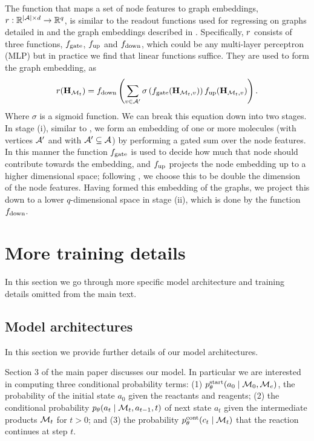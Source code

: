 The function that maps a set of node features to  graph embeddings, $r: \mathbb{R}^{|{\mathcal{A}}|\times d} \to \mathbb{R}^{q}$, is similar to the readout functions used for regressing on graphs detailed in \citep[Eq. 3]{gilmer2017neural} and the graph embeddings described in \citet[\S B.1]{li2018learning}. 
Specifically, $r$ consists of three functions, $f_\textrm{gate}$, $f_\textrm{up}$ and $f_\textrm{down}$, which could be any multi-layer perceptron (MLP) but in practice we find that linear functions suffice.
They are used to form the graph embedding, as
\begin{align}
	r({\mathbf{H}}_{{\mathcal{M}}_t}) = f_\textrm{down}\left(\sum_{v \in {\mathcal{A}}'} \sigma\left(f_\textrm{gate}({\mathbf{H}}_{{\mathcal{M}}_t,v})\right) f_\textrm{up}({\mathbf{H}}_{{\mathcal{M}}_t, v})\right).
	\label{eq:graph-embedding}
\end{align}
Where $\sigma$ is a sigmoid function.
We can break this equation down into two stages.
In stage (i), similar to \citet[\S B.1]{li2018learning}, we form an embedding of one or more molecules (with vertices ${\mathcal{A}}'$ and with ${\mathcal{A}}' \subseteq  {\mathcal{A}}$) by performing a gated sum over the node features. 
In this manner the function $f_\textrm{gate}$ is used to decide how much that node should contribute towards the embedding,
 and $f_\textrm{up}$ projects the node embedding up to a higher dimensional space; following \citet[\S B.1]{li2018learning}, we choose this to be double the dimension of the node features.
Having formed this embedding of the graphs, we project this down to a lower $q$-dimensional space in stage (ii), which is done by the function $f_\textrm{down}$. 







\section{More training details}

In this section we go through more specific model architecture and training details omitted from the main text. 

\subsection{Model architectures}
In this section we provide further details of our model architectures.

Section 3 of the main paper discusses our model.
In particular we are interested in computing three conditional probability terms: (1) $p_\theta^{\mathrm{start}}(a_0 \mid {\mathcal{M}}_0, {\mathcal{M}}_e)$, the probability of the initial state $a_0$ given the reactants and reagents; 
(2) the conditional probability $p_\theta(a_t \mid {\mathcal{M}}_t, a_{t-1}, t)$  
of next state $a_t$ given the intermediate products ${\mathcal{M}}_t$ for $t > 0$;
and (3) the probability $p_\theta^{\mathrm{cont}}(c_{t} \mid {\mathcal{M}}_{t})$ that the reaction continues at step $t$.

